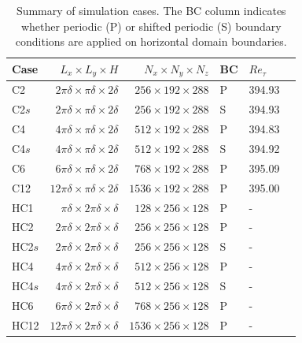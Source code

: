 		\begin{table}
			\begin{threeparttable}


			\caption[Summary of simulation cases for shifted periodic boundary conditions illustration.]{Summary of simulation cases. The BC column indicates whether periodic (P) or shifted periodic (S) boundary conditions are applied on horizontal domain boundaries. \label{tab:cases}
			} 
			\centering
			\begin{tabularx}{\textwidth}{Xrrlll}
				\hline \rule{0pt}{2.8ex}Case       	& $L_x \times L_y \times H$ 						& $N_x  \times N_y \times N_z$ 	& BC 	& $Re_\tau$ 	\\
				\hline \rule{0pt}{2.8ex}C2 		& $2\pi\delta \times \pi\delta \times 2\delta$  	& $256  \times 192 \times 288$ 	& P 	& 394.93 		 \\
				C2$s$	& $2\pi\delta \times \pi\delta \times 2\delta$  	& $256  \times 192 \times 288$ 	& S 	& 394.93 		 \\
				C4 		& $4\pi\delta \times \pi\delta \times 2\delta$  	& $512  \times 192 \times 288$ 	& P 	& 394.83 		 \\
				C4$s$  	& $4\pi\delta \times \pi\delta \times 2\delta$  	& $512  \times 192 \times 288$ 	& S 	& 394.92 		 \\
				C6 		& $6\pi\delta \times \pi\delta \times 2\delta$  	& $768  \times 192 \times 288$ 	& P 	& 395.09		 \\
				C12 		& $12\pi\delta \times \pi\delta \times 2\delta$  	& $1536 \times 192 \times 288$	& P 	& 395.00		 \\
				
				\hline \rule{0pt}{2.8ex}HC1  	& $\pi \delta \times 2\pi \delta \times \delta$ 	& $128 \times 256 \times 128$ 	& P 	& -				 \\
				HC2  	& $2\pi \delta \times 2\pi \delta \times \delta$ 	& $256 \times 256 \times 128$ 	& P 	& -				 \\
				HC2$s$  	& $2\pi \delta \times 2\pi \delta \times \delta$ 	& $256 \times 256 \times 128$ 	& S 	& -				 \\
				HC4  	& $4\pi \delta \times 2\pi \delta \times \delta$ 	& $512 \times 256 \times 128$ 	& P 	& -				 \\
				HC4$s$	& $4\pi \delta \times 2\pi \delta \times \delta$ 	& $512 \times 256 \times 128$ 	& S 	& -				 \\
				HC6  	& $6\pi \delta \times 2\pi \delta \times \delta$ 	& $768 \times 256 \times 128$ 	& P 	& -				 \\
				HC12 	& $12\pi \delta \times 2\pi \delta \times \delta$ 	& $1536 \times 256 \times 128$ 	& P 	& -				 \\
				\hline
			\end{tabularx}
		

\end{threeparttable}
\end{table}
